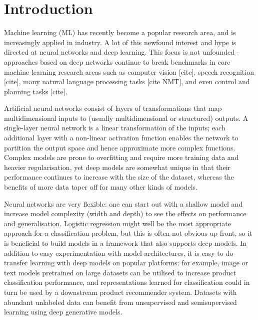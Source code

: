 \chapter{Introduction}


Machine learning (ML) has recently become a popular research area, and is increasingly applied in industry.
A lot of this newfound interest and hype is directed at  neural networks and deep learning.
This focus is not unfounded - approaches based on deep networks continue to break benchmarks in  core machine learning research areas such as computer vision [cite], speech recognition [cite], many natural language processing tasks [cite NMT], and even control and planning tasks [cite].

Artificial neural networks consist of layers of transformations that map multidimensional inputs to (usually multidimensional or structured) outputs.
A single-layer neural network is a linear transformation of the inputs; each additional layer with a non-linear activation function enables the network to partition the output space and hence approximate more complex functions.
Complex models are prone to overfitting and require more training data and heavier regularisation, yet deep models are somewhat unique in that their performance continues to increase with the size of the dataset, whereas the benefits of more data taper off for many other kinds of models.

Neural networks are very flexible: one can start out with a shallow model and increase model complexity (width and depth) to see the effects on performance and generalisation.
Logistic regression might well be the most appropriate approach for a classification problem, but this is often not obvious up front, so it is beneficial to build models in a framework that also supports deep models.
In addition to easy experimentation with model architectures, it is easy to do transfer learning with deep models on popular platforms: for example, image or text models pretrained on large datasets can be utilised to increase product classification performance, and representations learned for classification could in turn be used by a downstream product recommender system.
Datasets with abundant unlabeled data can benefit from unsupervised and semisupervised learning using deep generative models.

